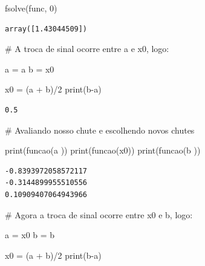 \documentclass[
  letterpaper,
  DIV=11,
  numbers=noendperiod]{scrreprt}
\newenvironment{Shaded}{\begin{snugshade}}{\end{snugshade}}
\newcommand{\BuiltInTok}[1]{\textcolor[rgb]{0.00,0.23,0.31}{#1}}
\newcommand{\CommentTok}[1]{\textcolor[rgb]{0.37,0.37,0.37}{#1}}
\newcommand{\DecValTok}[1]{\textcolor[rgb]{0.68,0.00,0.00}{#1}}
\newcommand{\NormalTok}[1]{\textcolor[rgb]{0.00,0.23,0.31}{#1}}
\newcommand{\OperatorTok}[1]{\textcolor[rgb]{0.37,0.37,0.37}{#1}}
\begin{document}
\begin{Shaded}
\begin{Highlighting}[]
\NormalTok{fsolve(func, }\DecValTok{0}\NormalTok{)}
\end{Highlighting}
\end{Shaded}

\begin{verbatim}
array([1.43044509])
\end{verbatim}

\begin{Shaded}
\begin{Highlighting}[]
\CommentTok{\# A troca de sinal ocorre entre a e x0, logo:}

\NormalTok{a }\OperatorTok{=}\NormalTok{ a}
\NormalTok{b }\OperatorTok{=}\NormalTok{ x0}

\NormalTok{x0 }\OperatorTok{=}\NormalTok{ (a }\OperatorTok{+}\NormalTok{ b)}\OperatorTok{/}\DecValTok{2}
\BuiltInTok{print}\NormalTok{(b}\OperatorTok{{-}}\NormalTok{a)}
\end{Highlighting}
\end{Shaded}

\begin{verbatim}
0.5
\end{verbatim}

\begin{Shaded}
\begin{Highlighting}[]
\CommentTok{\# Avaliando nosso chute e escolhendo novos chutes}

\BuiltInTok{print}\NormalTok{(funcao(a ))}
\BuiltInTok{print}\NormalTok{(funcao(x0))}
\BuiltInTok{print}\NormalTok{(funcao(b ))}
\end{Highlighting}
\end{Shaded}

\begin{verbatim}
-0.8393972058572117
-0.3144899955510556
0.10909407064943966
\end{verbatim}

\begin{Shaded}
\begin{Highlighting}[]
\CommentTok{\# Agora a troca de sinal ocorre entre x0 e b, logo:}

\NormalTok{a }\OperatorTok{=}\NormalTok{ x0}
\NormalTok{b }\OperatorTok{=}\NormalTok{ b}

\NormalTok{x0 }\OperatorTok{=}\NormalTok{ (a }\OperatorTok{+}\NormalTok{ b)}\OperatorTok{/}\DecValTok{2}
\BuiltInTok{print}\NormalTok{(b}\OperatorTok{{-}}\NormalTok{a)}
\end{Highlighting}
\end{Shaded}
\end{document}

